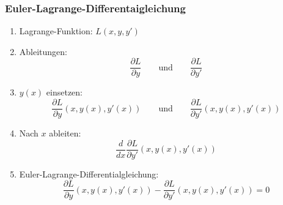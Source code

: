 %
%
%
\bgroup
\begin{frame}[t]
\setlength{\abovedisplayskip}{5pt}
\setlength{\belowdisplayskip}{5pt}
\frametitle{Euler-Lagrange-Differentaigleichung}
\begin{enumerate}
\item<2-> Lagrange-Funktion: $L(x,y,y')$
\item<3-> Ableitungen:
\[
\frac{\partial L}{\partial y}
\qquad\text{und}\qquad
\frac{\partial L}{\partial y'}
\]
\item<4-> $y(x)$ einsetzen:
\[
\frac{\partial L}{\partial y}(x,y(x),y'(x))
\qquad\text{und}\qquad
\frac{\partial L}{\partial y'}(x,y(x),y'(x))
\]
\item<5-> Nach $x$ ableiten:
\[
\frac{d}{dx}
\frac{\partial L}{\partial y'}(x,y(x),y'(x))
\]
\item<6-> Euler-Lagrange-Differentialgleichung:
\[
\frac{\partial L}{\partial y}(x,y(x),y'(x))
-
\frac{\partial L}{\partial y'}(x,y(x),y'(x))
=
0
\]
\end{enumerate}
\vspace{-20pt}
\begin{columns}[t,onlytextwidth]
\begin{column}{0.48\textwidth}
\end{column}
\begin{column}{0.48\textwidth}
\end{column}
\end{columns}
\end{frame}
\egroup
